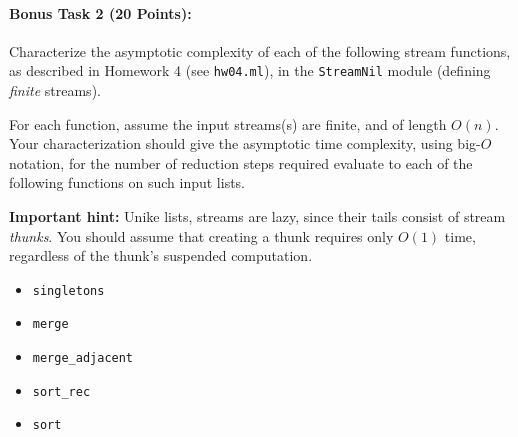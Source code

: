 \documentclass{article}
\begin{document}
\paragraph{Bonus Task 2 (20 Points):}
Characterize the asymptotic complexity of each of the following stream
functions, as described in Homework 4 (see \texttt{hw04.ml}), in the
\texttt{StreamNil} module (defining \emph{finite} streams).

For each function, assume the input streams(s) are finite, and of
length $O(n)$.  Your characterization should give the asymptotic time
complexity, using big-$O$ notation, for the number of reduction steps
required evaluate to each of the following functions on such input
lists.

\textbf{Important hint:} Unike lists, streams are lazy, since their
tails consist of stream \emph{thunks}.  
You should assume that creating a thunk
requires only $O(1)$ time, regardless of the thunk's suspended computation.

\begin{itemize}
\item \texttt{singletons}
\item \texttt{merge}
\item \texttt{merge\_adjacent}
\item \texttt{sort\_rec} 
\item \texttt{sort}
\end{itemize}
\end{document}
